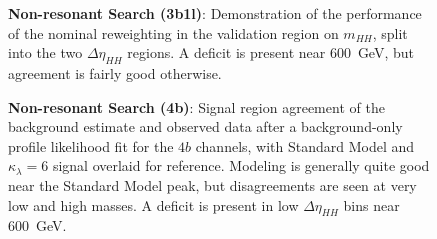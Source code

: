 \begin{figure}[ht]
  \centering
  \caption{\label{fig:nonres-3b1l-VR} \textbf{Non-resonant Search (3b1l)}: Demonstration of the performance of the nominal reweighting in the validation region on $m_{HH}$, split into the two $\Delta\eta_{HH}$ regions. A deficit 
  is present near \SI{600}{\GeV}, but agreement is fairly good otherwise.}
\end{figure}


\begin{figure}[ht]
  \centering
  \hspace*{-2cm}
  \caption{\label{fig:nonres-sr-mhh-4b} \textbf{Non-resonant Search (4b)}: Signal region agreement of the background estimate and observed data after a background-only profile likelihood fit for the $4b$ channels, with Standard Model 
  and $\kappa_{\lambda}=6$ signal overlaid for reference. Modeling is generally quite good near the Standard Model peak, but disagreements are seen at very low and high masses. A deficit is present in low $\Delta\eta_{HH}$ bins near \SI{600}{\GeV}.}
\end{figure}

